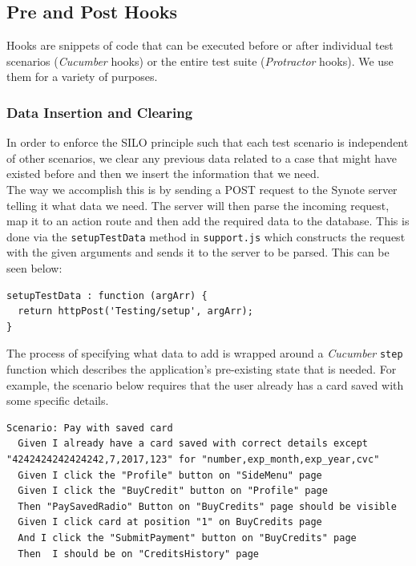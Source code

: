 \subsection{Pre and Post Hooks}
\label{subsec:pre-and-post-hooks}

Hooks are snippets of code that can be executed before or after individual test scenarios (\textit{Cucumber} hooks) or the entire test suite (\textit{Protractor} hooks). We use them for a variety of purposes.

\subsubsection{Data Insertion and Clearing}
\label{subsubsec:data-insertion-and-clearing}
In order to enforce the SILO principle such that each test scenario is independent of other scenarios, we clear any previous data related to a case that might have existed before and then we insert the information that we need.\\

The way we accomplish this is by sending a POST request to the Synote server telling it what data we need. The server will then parse the incoming request, map it to an action route and then add the required data to the database. This is done via the \texttt{setupTestData} method in \texttt{support.js} which constructs the request with the given arguments and sends it to the server to be parsed. This can be seen below:

\begin{listing}[H]
\begin{verbatim}
setupTestData : function (argArr) {
  return httpPost('Testing/setup', argArr);
}
\end{verbatim}
\label{lst:inserting-test-data}
\end{listing}

The process of specifying what data to add is wrapped around a \textit{Cucumber} \texttt{step} function which describes the application's pre-existing state that is needed. For example, the scenario below requires that the user already has a card saved with some specific details.

\begin{listing}[H]
\begin{verbatim}
Scenario: Pay with saved card
  Given I already have a card saved with correct details except "4242424242424242,7,2017,123" for "number,exp_month,exp_year,cvc"
  Given I click the "Profile" button on "SideMenu" page
  Given I click the "BuyCredit" button on "Profile" page
  Then "PaySavedRadio" Button on "BuyCredits" page should be visible
  Given I click card at position "1" on BuyCredits page
  And I click the "SubmitPayment" button on "BuyCredits" page
  Then  I should be on "CreditsHistory" page
\end{verbatim}
\label{lst:example-scenario-with-db-setup}
\end{listing}

